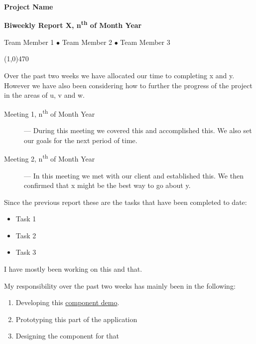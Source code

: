 \documentclass[11pt]{report}
\begin{document}
\centerline{{\LARGE \bf Project Name}}

\centerline{ \large \bf Biweekly Report X, n\textsuperscript{th} of Month Year}
\centerline{ Team Member 1 $\bullet$ Team Member 2 $\bullet$ Team Member 3 }
\noindent
\line(1,0){470}\\


\smallskip

\noindent
Over the past two weeks we have allocated our time to completing x and y. \\

\noindent
However we have also been considering how to further the progress of the project in the areas of u, v and w. \\

\bigskip
{}
\smallskip

\begin{description}
  \item[Meeting 1, n\textsuperscript{th} of Month Year] --- During this meeting we covered this and accomplished this. We also set our goals for the next period of time.
  \item[Meeting 2, n\textsuperscript{th} of Month Year] --- In this meeting we met with our client and established this. We then confirmed that x might be the best way to go about y.
\end{description}

\bigskip
{}
\smallskip

\noindent
Since the previous report these are the tasks that have been completed to date:
\begin{itemize}
  \item Task 1
  \item Task 2
  \item Task 3
\end{itemize}

\bigskip
{}
\smallskip

\noindent
I have mostly been working on this and that. \\

\bigskip
{}
\smallskip

\noindent
My responsibility over the past two weeks has mainly been in the following:

\begin{enumerate}
  \item Developing this \href{http://google.com}{component demo}.
  \item Prototyping this part of the application
  \item Designing the component for that
\end{enumerate}
\end{document}
